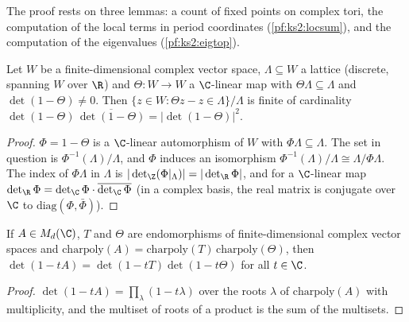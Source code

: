 The proof rests on three lemmas: a count of fixed points on complex tori, the computation of the
local terms in period coordinates (\cref{pf:ks2:locsum}), and the computation of the eigenvalues
(\cref{pf:ks2:eigtop}).

\begin{lemma}\label{pf:ks2:torus}
Let $W$ be a finite-dimensional complex vector space, $\Lambda\subseteq W$ a lattice (discrete, spanning
$W$ over $\R$) and $\Theta\colon W\to W$ a $\C$-linear map with $\Theta\Lambda\subseteq\Lambda$ and
$\det(1-\Theta)\ne0$. Then $\{z\in W:\Theta z-z\in\Lambda\}/\Lambda$ is finite of cardinality
$\det(1-\Theta)\,\overline{\det(1-\Theta)}=|\det(1-\Theta)|^2$.
\end{lemma}

\begin{proof}
$\Phi=1-\Theta$ is a $\C$-linear automorphism of $W$ with $\Phi\Lambda\subseteq\Lambda$. The set in
question is $\Phi^{-1}(\Lambda)/\Lambda$, and $\Phi$ induces an isomorphism $\Phi^{-1}(\Lambda)/\Lambda\cong
\Lambda/\Phi\Lambda$. The index of $\Phi\Lambda$ in $\Lambda$ is $|\det_\Z(\Phi|_\Lambda)|=|\det_\R\Phi|$, and
for a $\C$-linear map $\det_\R\Phi=\det_\C\Phi\cdot\overline{\det_\C\Phi}$ (in a complex basis, the real
matrix is conjugate over $\C$ to $\mathrm{diag}(\Phi,\bar\Phi)$).
\end{proof}

\begin{lemma}\label{pf:ks2:detchar}
If $A\in M_d(\C)$, $T$ and $\Theta$ are endomorphisms of finite-dimensional complex vector spaces and
$\mathrm{charpoly}(A)=\mathrm{charpoly}(T)\,\mathrm{charpoly}(\Theta)$, then
$\det(1-tA)=\det(1-tT)\det(1-t\Theta)$ for all $t\in\C$.
\end{lemma}

\begin{proof}
$\det(1-tA)=\prod_\lambda(1-t\lambda)$ over the roots $\lambda$ of $\mathrm{charpoly}(A)$ with
multiplicity, and the multiset of roots of a product is the sum of the multisets.
\end{proof}

